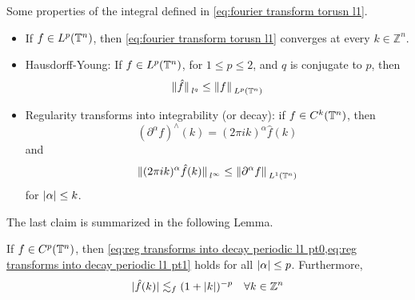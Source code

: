 \documentclass[../main-v2-manifolds.tex]{subfiles}
\begin{document}
Some properties of the integral defined in \cref{eq:fourier transform torusn l1}.
\begin{itemize}
    \item If $f\in L^p({\mathbb{T}^n})$, then \cref{eq:fourier transform torusn l1} converges at every $k\in\mathbb{Z}^n$. 
    \item Hausdorff-Young: If $f\in L^p({\mathbb{T}^n})$, for $1\leq p\leq 2$, and $q$ is conjugate to $p$, then 
    \[
        \norm*{\hat{f}}_{l^q}\leq\norm*{f}_{L^p({\mathbb{T}^n})}
    \]
    \item Regularity transforms into integrability (or decay): if $f\in C^k({\mathbb{T}^n})$, then 
    \begin{equation}
        (\partial^\alpha f)^\wedge(k) = (2\pi i k)^{\alpha}\hat{f}(k)
        \label{eq:reg transforms into decay periodic l1 pt0}
    \end{equation}
    and
    \begin{equation}
        \norm*{(2\pi i k)^{\alpha}\hat{f}(k)}_{l^\infty}\leq \norm*{\partial^\alpha f}_{L^1({\mathbb{T}^n})}
        \label{eq:reg transforms into decay periodic l1 pt1}
    \end{equation}
    for $\vert {\alpha} \vert\leq k$.
\end{itemize}
The last claim is summarized in the following Lemma.
\begin{lemma}\label{lem:regularity transforms into decay periodic functions}
    If $f\in C^p({\mathbb{T}^n})$, then \cref{eq:reg transforms into decay periodic l1 pt0,eq:reg transforms into decay periodic l1 pt1} holds for all $\vert {\alpha} \vert\leq p$. Furthermore, 
    \begin{equation}
        \vert {\hat{f}(k)} \vert\lesssim_{f} (1+\vert {k} \vert)^{-p}\quad\forall k\in\mathbb{Z}^n
        \label{eq:reg transforms into decay periodic l1 pt2}
    \end{equation}
\end{lemma}
\end{document}
